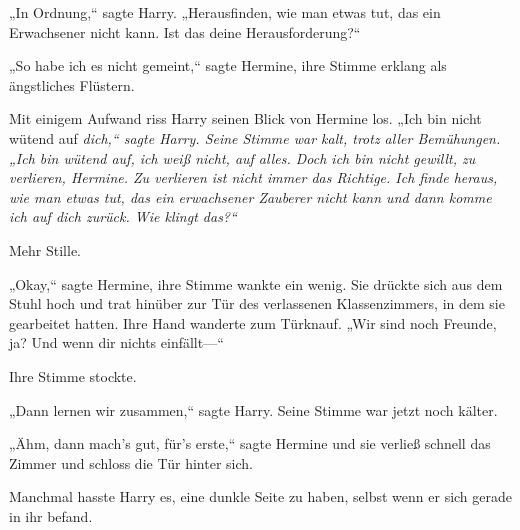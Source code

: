„In Ordnung,“ sagte Harry. „Herausfinden, wie man etwas tut, das ein Erwachsener nicht kann. Ist das deine Herausforderung?“

„So habe ich es nicht gemeint,“ sagte Hermine, ihre Stimme erklang als ängstliches Flüstern.

Mit einigem Aufwand riss Harry seinen Blick von Hermine los. „Ich bin nicht wütend auf \emph{dich,“ sagte Harry. Seine Stimme war kalt, trotz aller Bemühungen. „Ich bin wütend auf, ich weiß nicht, auf alles. Doch ich bin nicht gewillt, zu verlieren, Hermine. Zu verlieren ist nicht immer das Richtige. Ich finde heraus, wie man etwas tut, das ein erwachsener Zauberer nicht kann und dann komme ich auf dich zurück. Wie klingt das?“}

Mehr Stille.

„Okay,“ sagte Hermine, ihre Stimme wankte ein wenig. Sie drückte sich aus dem Stuhl hoch und trat hinüber zur Tür des verlassenen Klassenzimmers, in dem sie gearbeitet hatten. Ihre Hand wanderte zum Türknauf. „Wir sind noch Freunde, ja? Und wenn dir nichts einfällt—“

Ihre Stimme stockte.

„Dann lernen wir zusammen,“ sagte Harry. Seine Stimme war jetzt noch kälter.

„Ähm, dann mach's gut, für's erste,“ sagte Hermine und sie verließ schnell das Zimmer und schloss die Tür hinter sich.

Manchmal hasste Harry es, eine dunkle Seite zu haben, selbst wenn er sich gerade in ihr befand.

